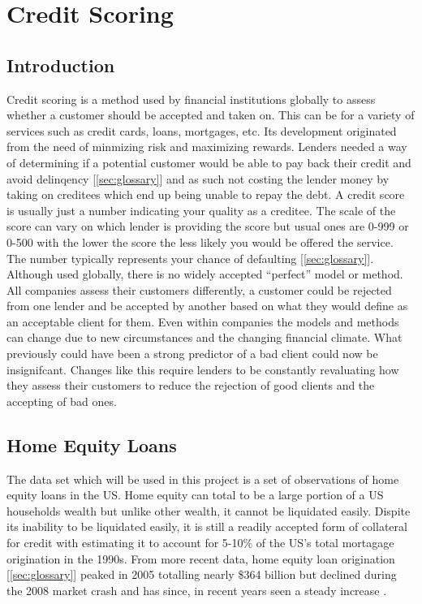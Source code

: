 \chapter{Credit Scoring}

\section{Introduction}
Credit scoring is a method used by financial institutions globally to assess whether a customer should be accepted and taken on. This can be for a variety of services such as credit cards, loans, mortgages, etc. Its development originated from the need of minmizing risk and maximizing rewards. Lenders needed a way of determining if a potential customer would be able to pay back their credit and avoid delinqency [\ref{sec:glossary}] and as such not costing the lender money by taking on creditees which end up being unable to repay the debt. A credit score is usually just a number indicating your quality as a creditee. The scale of the score can vary on which lender is providing the score but usual ones are 0-999 or 0-500 with the lower the score the less likely you would be offered the service. The number typically represents your chance of defaulting [\ref{sec:glossary}]. \\

Although used globally, there is no widely accepted ``perfect'' model or method. All companies assess their customers differently, a customer could be rejected from one lender and be accepted by another based on what they would define as an acceptable client for them. Even within companies the models and methods can change due to new circumstances and the changing financial climate. What previously could have been a strong predictor of a bad client could now be insignifcant. Changes like this require lenders to be constantly revaluating how they assess their customers to reduce the rejection of good clients and the accepting of bad ones.

\section{Home Equity Loans}
The data set which will be used in this project is a set of observations of home equity loans in the US. Home equity can total to be a large portion of a US households wealth but unlike other wealth, it cannot be liquidated easily. Dispite its inability to be liquidated easily, it is still a readily accepted form of collateral for credit \parencite{canner1998recent} with \parencite{weicher1997home} estimating it to account for 5-10\% of the US's total mortagage origination in the 1990s. From more recent data, home equity loan origination [\ref{sec:glossary}] peaked in 2005 totalling nearly \$364 billion but declined during the 2008 market crash and has since, in recent years seen a steady increase \parencite{corelogic2016home}. \\

